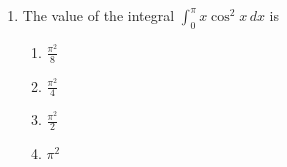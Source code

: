 \documentclass[journal,12pt,onecolumn]{IEEEtran}
\theoremstyle{remark}
\begin{document}
\begin{enumerate}
\begin{large}
\end{large}

\item The value of the integral $\int_{0}^{\pi} x \cos^2 x \, dx $ is
\begin{multicols}{4}
    \begin{enumerate}
        \item $\frac{\pi^2}{8}$
        \item $\frac{\pi^2}{4}$
        \item $\frac{\pi^2}{2}$
        \item $\pi^2$
    \end{enumerate}
\end{multicols}
\end{enumerate}
\end{document}
